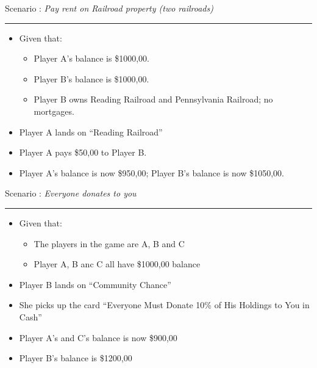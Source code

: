 \documentclass[handout,t,12pt]{beamer}
\newcommand{\Square}[1]{``#1''}
\newcommand{\Card}[1]{``#1''}
\newcommand{\money}[1]{\$#1,00}
\newcounter{scenarioid}\setcounter{scenarioid}{0}
\newenvironment{scenario}[1]{%
\addtocounter{scenarioid}{1} 
{\Large Scenario \thescenarioid: \emph{#1}\\[3px]\hrule}
\vspace{1\bigskipamount}
}{%
}
\begin{document}
  \begin{frame}
    \begin{scenario}{Pay rent on Railroad property (two railroads)}
      \begin{itemize}
        \item Given that:
        \begin{itemize}
          \item Player A's balance is \money{1000}.
          \item Player B's balance is \money{1000}.
          \item Player B owns Reading Railroad and Pennsylvania Railroad; no        mortgages.\end{itemize}
          \item Player A lands on \Square{Reading Railroad}
          \item Player A pays \money{50} to Player B.
          \item Player A's balance is now  \money{950}; Player B's balance is now \money{1050}.
      \end{itemize}
    \end{scenario}
  \end{frame}
  


  \begin{frame}
    \begin{scenario}{Everyone donates to you}
      \begin{itemize}
        \item Given that:
        \begin{itemize}
          \item The players in the game are A, B and C
          \item Player A, B anc C all have \money{1000} balance
        \end{itemize}
        \item Player B lands on \Square{Community Chance}
        \item She picks up the card \Card{Everyone Must Donate 10\% of His Holdings to You in Cash}
        \item Player A's and C's balance is now \money{900}
        \item Player B's balance is \money{1200}
      \end{itemize}
    \end{scenario}
  \end{frame}
\end{document}
